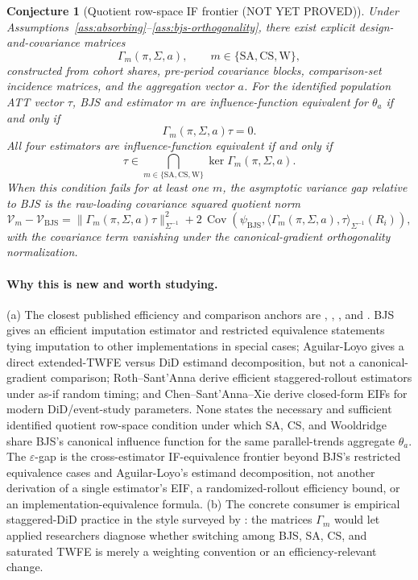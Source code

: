 \documentclass[11pt]{article}
\theoremstyle{definition}
\theoremstyle{plain}
\newtheorem{conjecture}{Conjecture}
\theoremstyle{remark}
\begin{document}
\begin{conjecture}[Quotient row-space IF frontier (NOT YET PROVED)]\label{conj:quotient-frontier}
Under Assumptions~\ref{ass:absorbing}--\ref{ass:bjs-orthogonality}, there exist explicit
design-and-covariance matrices
\[
  \Gamma_m(\pi,\Sigma,a),\qquad m\in\{\mathrm{SA},\mathrm{CS},\mathrm{W}\},
\]
constructed from cohort shares, pre-period covariance blocks, comparison-set incidence matrices, and
the aggregation vector \(a\).  For the identified population ATT vector \(\tau\), BJS and estimator
\(m\) are influence-function equivalent for \(\theta_a\) if and only if
\[
  \Gamma_m(\pi,\Sigma,a)\tau=0.
\]
All four estimators are influence-function equivalent if and only if
\[
  \tau\in
  \bigcap_{m\in\{\mathrm{SA},\mathrm{CS},\mathrm{W}\}}\ker \Gamma_m(\pi,\Sigma,a).
\]
When this condition fails for at least one \(m\), the asymptotic variance gap relative to BJS is the
raw-loading covariance squared quotient norm
\[
  \mathcal V_m-\mathcal V_{\mathrm{BJS}}
    =
    \|\Gamma_m(\pi,\Sigma,a)\tau\|_{\Sigma^{-1}}^2
    + 2\,\operatorname{Cov}\!\left(\psi_{\mathrm{BJS}},
      \langle \Gamma_m(\pi,\Sigma,a),\tau\rangle_{\Sigma^{-1}}(R_i)\right),
\]
with the covariance term vanishing under the canonical-gradient orthogonality normalization.
\end{conjecture}
\paragraph{Why this is new and worth studying.}
(a) The closest published efficiency and comparison anchors are \citet{BorusyakJaravelSpiess2024},
\citet{AguilarLoyo2025}, \citet{RothSantAnna2021Efficient}, and \citet{ChenSantAnnaXie2025}.
BJS gives an efficient imputation estimator and restricted equivalence statements tying imputation to
other implementations in special cases; Aguilar-Loyo gives a direct extended-TWFE versus DiD
estimand decomposition, but not a canonical-gradient comparison; Roth--Sant'Anna derive efficient
staggered-rollout estimators under as-if random timing; and Chen--Sant'Anna--Xie derive closed-form
EIFs for modern DiD/event-study parameters.  None states the necessary and sufficient identified
quotient row-space condition under which SA, CS, and Wooldridge share BJS's canonical influence
function for the same parallel-trends aggregate \(\theta_a\).  The \(\varepsilon\)-gap is the
cross-estimator IF-equivalence frontier beyond BJS's restricted equivalence cases and
Aguilar-Loyo's estimand decomposition, not another derivation of a single estimator's EIF, a
randomized-rollout efficiency bound, or an implementation-equivalence formula.  (b) The concrete
consumer is empirical staggered-DiD practice in the style surveyed by
\citet{RothSantAnnaBilinskiPoe2023}: the matrices \(\Gamma_m\) would let applied researchers diagnose
whether switching among BJS, SA, CS, and saturated TWFE is merely a weighting convention or an
efficiency-relevant change.
\end{document}
